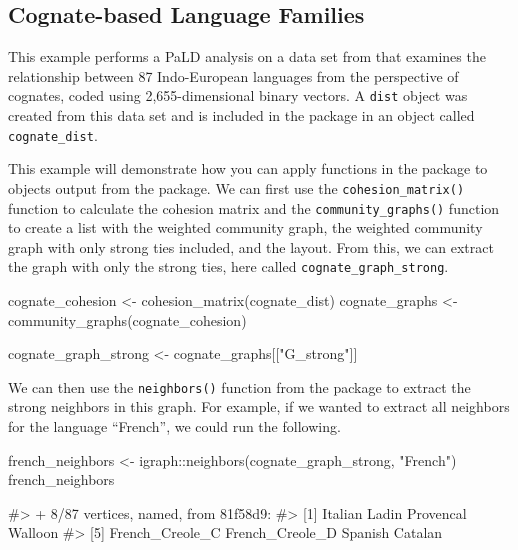 \hypertarget{cognate-based-language-families}{%
\subsection{Cognate-based Language
Families}\label{cognate-based-language-families}}

This example performs a PaLD analysis on a data set from \citet{dyen92}
that examines the relationship between 87 Indo-European languages from
the perspective of cognates, coded using 2,655-dimensional binary
vectors. A \texttt{dist} object was created from this data set and is
included in the  package in an object called
\texttt{cognate\_dist}.

This example will demonstrate how you can apply functions in the
 package to objects output from the 
package. We can first use the \texttt{cohesion\_matrix()} function to
calculate the cohesion matrix and the \texttt{community\_graphs()}
function to create a list with the weighted community graph, the
weighted community graph with only strong ties included, and the layout.
From this, we can extract the graph with only the strong ties, here
called \texttt{cognate\_graph\_strong}.

\begin{Schunk}
\begin{Sinput}
cognate_cohesion <- cohesion_matrix(cognate_dist)
cognate_graphs <- community_graphs(cognate_cohesion)

cognate_graph_strong <- cognate_graphs[["G_strong"]]
\end{Sinput}
\end{Schunk}

We can then use the \texttt{neighbors()} function from the
 package to extract the strong neighbors in this graph.
For example, if we wanted to extract all neighbors for the language
``French'', we could run the following.

\begin{Schunk}
\begin{Sinput}
french_neighbors <- igraph::neighbors(cognate_graph_strong, "French")
french_neighbors
\end{Sinput}
\begin{Soutput}
#> + 8/87 vertices, named, from 81f58d9:
#> [1] Italian         Ladin           Provencal       Walloon        
#> [5] French_Creole_C French_Creole_D Spanish         Catalan
\end{Soutput}
\end{Schunk}


